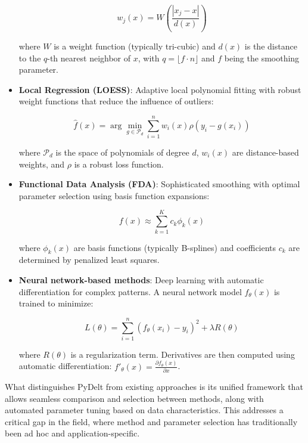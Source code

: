 \documentclass[10pt,journal,compsoc]{IEEEtran}
\begin{document}
\begin{itemize}
    \begin{equation}
        w_j(x) = W\left(\frac{|x_j - x|}{d(x)}\right)
    \end{equation}
    
    where $W$ is a weight function (typically tri-cubic) and $d(x)$ is the distance to the $q$-th nearest neighbor of $x$, with $q = \lfloor f \cdot n \rfloor$ and $f$ being the smoothing parameter.
    
    \item \textbf{Local Regression (LOESS)}: Adaptive local polynomial fitting with robust weight functions that reduce the influence of outliers:
    
    \begin{equation}
        \hat{f}(x) = \arg\min_{g \in \mathcal{P}_d} \sum_{i=1}^{n} w_i(x) \rho\left(y_i - g(x_i)\right)
    \end{equation}
    
    where $\mathcal{P}_d$ is the space of polynomials of degree $d$, $w_i(x)$ are distance-based weights, and $\rho$ is a robust loss function.
    
    \item \textbf{Functional Data Analysis (FDA)}: Sophisticated smoothing with optimal parameter selection using basis function expansions:
    
    \begin{equation}
        f(x) \approx \sum_{k=1}^{K} c_k \phi_k(x)
    \end{equation}
    
    where $\phi_k(x)$ are basis functions (typically B-splines) and coefficients $c_k$ are determined by penalized least squares.
    
    \item \textbf{Neural network-based methods}: Deep learning with automatic differentiation for complex patterns. A neural network model $f_{\theta}(x)$ is trained to minimize:
    
    \begin{equation}
        L(\theta) = \sum_{i=1}^{n} \left(f_{\theta}(x_i) - y_i\right)^2 + \lambda R(\theta)
    \end{equation}
    
    where $R(\theta)$ is a regularization term. Derivatives are then computed using automatic differentiation: $f'_{\theta}(x) = \frac{\partial f_{\theta}(x)}{\partial x}$.
\end{itemize}

What distinguishes PyDelt from existing approaches is its unified framework that allows seamless comparison and selection between methods, along with automated parameter tuning based on data characteristics. This addresses a critical gap in the field, where method and parameter selection has traditionally been ad hoc and application-specific.
\end{document}
